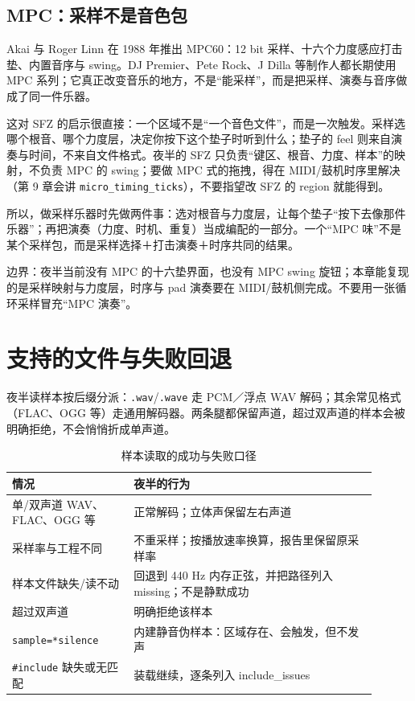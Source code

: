 \subsection{MPC：采样不是音色包}

Akai 与 Roger Linn 在 1988 年推出 MPC60：12 bit 采样、十六个力度感应打击垫、内置音序与 swing。DJ Premier、Pete Rock、J Dilla 等制作人都长期使用 MPC 系列；它真正改变音乐的地方，不是“能采样”，而是把采样、演奏与音序做成了同一件乐器。

这对 SFZ 的启示很直接：一个区域不是“一个音色文件”，而是一次触发。采样选哪个根音、哪个力度层，决定你按下这个垫子时听到什么；垫子的 feel 则来自演奏与时间，不来自文件格式。夜半的 SFZ 只负责“键区、根音、力度、样本”的映射，不负责 MPC 的 swing；要做 MPC 式的拖拽，得在 MIDI/鼓机时序里解决（第 9 章会讲 \texttt{micro\_timing\_ticks}），不要指望改 SFZ 的 region 就能得到。

所以，做采样乐器时先做两件事：选对根音与力度层，让每个垫子“按下去像那件乐器”；再把演奏（力度、时机、重复）当成编配的一部分。一个“MPC 味”不是某个采样包，而是采样选择＋打击演奏＋时序共同的结果。

边界：夜半当前没有 MPC 的十六垫界面，也没有 MPC swing 旋钮；本章能复现的是采样映射与力度层，时序与 pad 演奏要在 MIDI/鼓机侧完成。不要用一张循环采样冒充“MPC 演奏”。

\section{支持的文件与失败回退}

夜半读样本按后缀分派：\texttt{.wav}/\texttt{.wave} 走 PCM／浮点 WAV 解码；其余常见格式（FLAC、OGG 等）走通用解码器。两条腿都保留声道，超过双声道的样本会被明确拒绝，不会悄悄折成单声道。

\begin{table}[htbp]
\centering
\small
\begin{tabular}{@{}p{0.30\linewidth}p{0.60\linewidth}@{}}
\hline
情况 & 夜半的行为 \\
\hline
单/双声道 WAV、FLAC、OGG 等 & 正常解码；立体声保留左右声道 \\
采样率与工程不同 & 不重采样；按播放速率换算，报告里保留原采样率 \\
样本文件缺失/读不动 & 回退到 440 Hz 内存正弦，并把路径列入 missing；不是静默成功 \\
超过双声道 & 明确拒绝该样本 \\
\texttt{sample=*silence} & 内建静音伪样本：区域存在、会触发，但不发声 \\
\texttt{\#include} 缺失或无匹配 & 装载继续，逐条列入 include\_issues \\
\hline
\end{tabular}
\caption{样本读取的成功与失败口径}
\label{tab:sfz-samples}
\end{table}

